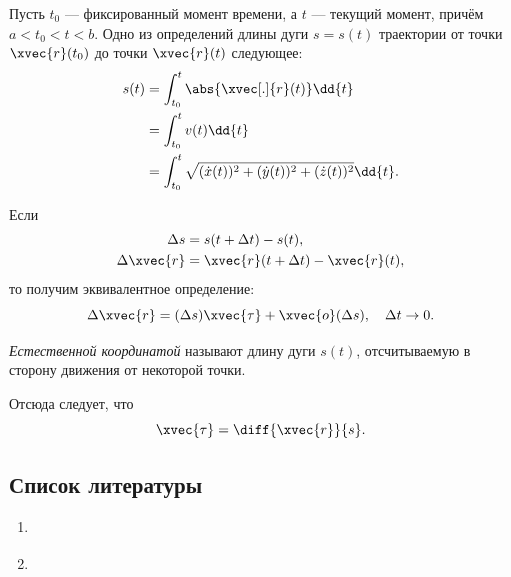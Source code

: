 \begin{definition}
  Пусть $t_0$ --- фиксированный момент времени, а $t$ --- текущий момент, причём
  $a < t_0 < t < b$. Одно из определений длины дуги $s = s(t)$ траектории от
  точки $\xvec{r}(t_0)$ до точки $\xvec{r}(t)$ следующее:
  \begin{equation*}
    \begin{aligned}
      s(t) &= \int_{t_0}^{t} \abs{\xvec[.]{r}(t)} \dd{t} \\
      &= \int_{t_0}^{t} v(t) \dd{t} \\
      &= \int_{t_0}^{t}
        \sqrt{(\dot{x}(t))^2 + (\dot{y}(t))^2 + (\dot{z}(t))^2} \dd{t}.
    \end{aligned}
  \end{equation*}

  Если
  \begin{equation*}
    \begin{aligned}
      \Delta s &= s(t + \Delta t) - s(t), \\
      \Delta \xvec{r} &= \xvec{r}(t + \Delta t) - \xvec{r}(t),
    \end{aligned}
  \end{equation*}
  то получим эквивалентное определение:
  \begin{equation*}
    \Delta \xvec{r} = (\Delta s) \xvec{\tau} + \xvec{o}(\Delta s), \quad
      \Delta t \to 0.
  \end{equation*}

  \textit{Естественной координатой} называют длину дуги $s(t)$, отсчитываемую в
  сторону движения от некоторой точки.

  Отсюда следует, что
  \begin{equation*}
    \xvec{\tau} = \diff{\xvec{r}}{s}.
  \end{equation*}
\end{definition}

\subsection{Список литературы}
\begin{enumerate}
  \item \cite{lectures}
  \item \cite{lourie}
\end{enumerate}

